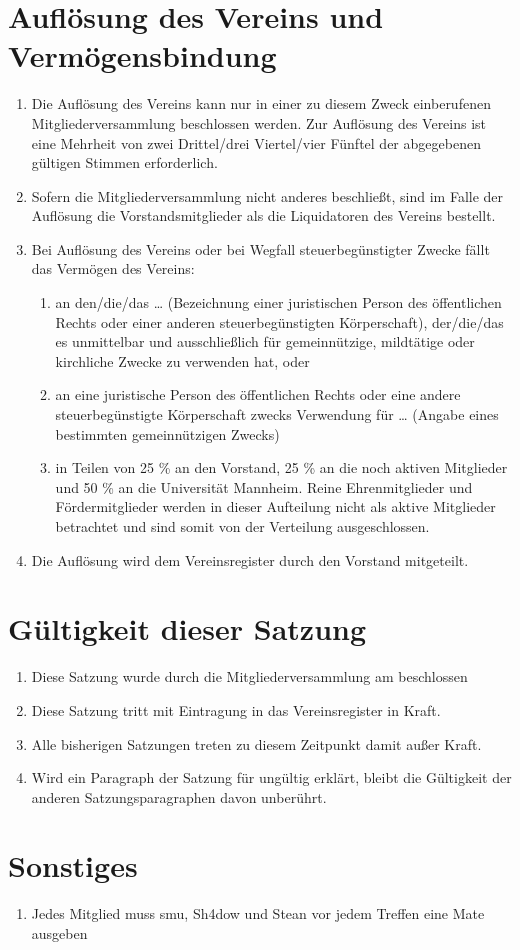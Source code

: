 \documentclass[a4paper,ngerman]{scrartcl}
\begin{document}
\section{Auflösung des Vereins und Vermögensbindung}
\begin{enumerate}
\item Die Auflösung des Vereins kann nur in einer zu diesem Zweck einberufenen Mitgliederversammlung beschlossen werden. Zur Auflösung des Vereins ist eine Mehrheit von zwei Drittel/drei Viertel/vier Fünftel der abgegebenen gültigen Stimmen erforderlich.
\item Sofern die Mitgliederversammlung nicht anderes beschließt, sind im Falle der Auflösung die Vorstandsmitglieder als die Liquidatoren des Vereins bestellt.
\item Bei Auflösung des Vereins oder bei Wegfall steuerbegünstigter Zwecke fällt das Vermögen des Vereins:
\begin{enumerate}
\item an den/die/das \dots{} (Bezeichnung einer juristischen Person des öffentlichen Rechts oder einer anderen steuerbegünstigten Körperschaft), der/die/das es unmittelbar und ausschließlich für gemeinnützige, mildtätige oder kirchliche Zwecke zu verwenden hat, oder
\item an eine juristische Person des öffentlichen Rechts oder eine andere steuerbegünstigte Körperschaft zwecks Verwendung für \dots{}
(Angabe eines bestimmten gemeinnützigen Zwecks)
\item in Teilen von 25 \% an den Vorstand, 25 \% an die noch aktiven Mitglieder und 50 \% an die Universität Mannheim. Reine Ehrenmitglieder und Fördermitglieder werden in dieser Aufteilung nicht als aktive Mitglieder betrachtet und sind somit von der Verteilung ausgeschlossen.
\end{enumerate}
\item Die Auflösung wird dem Vereinsregister durch den Vorstand mitgeteilt.
\end{enumerate}

\section{Gültigkeit dieser Satzung}
\begin{enumerate}
\item Diese Satzung wurde durch die Mitgliederversammlung am \MyDate beschlossen
\item Diese Satzung tritt mit Eintragung in das Vereinsregister in Kraft.
\item Alle bisherigen Satzungen treten zu diesem Zeitpunkt damit außer Kraft.
\item Wird ein Paragraph der Satzung für ungültig erklärt, bleibt die Gültigkeit der anderen Satzungsparagraphen davon unberührt.
\end{enumerate}

\section{Sonstiges}
\begin{enumerate}
\item Jedes Mitglied muss smu, Sh4dow und Stean vor jedem Treffen eine Mate ausgeben
\end{enumerate}
\end{document}
